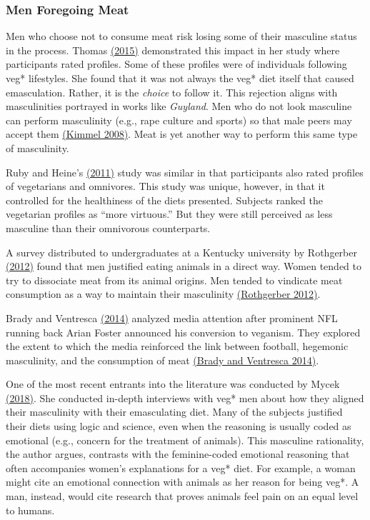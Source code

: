 \documentclass[twoside]{report}
\begin{document}
\begin{multicols}{2}
\subsubsection{Men Foregoing Meat}

Men who choose not to consume meat risk losing some of their masculine
status in the process. Thomas \hyperlink{thomas}{(2015)} demonstrated this impact in her study where participants rated profiles. Some of these profiles were of individuals following veg* lifestyles. She found that it was not always the veg* diet itself that caused emasculation. Rather, it is the
\emph{choice} to follow it. This rejection aligns with masculinities
portrayed in works like \emph{Guyland}. Men who do not look masculine can perform masculinity (e.g., rape culture and sports) so that male peers may accept them \hyperlink{kimmel}{(Kimmel 2008)}. Meat is yet another way
to perform this same type of masculinity.

Ruby and Heine's \hyperlink{ruby}{(2011)} study was similar in that participants also rated profiles of vegetarians and omnivores. This study was unique, however, in that it controlled for the healthiness of the diets
presented. Subjects ranked the vegetarian profiles as ``more virtuous.''
But they were still perceived as less masculine than their omnivorous
counterparts.

A survey distributed to undergraduates at a Kentucky
university by Rothgerber \hyperlink{rothgerber}{(2012)} found that men justified eating animals in a direct way. Women tended to try to dissociate meat from its animal origins. Men tended to vindicate meat consumption as a way to maintain their masculinity \hyperlink{rothgerber}{(Rothgerber 2012)}. 

Brady and Ventresca \hyperlink{brady}{(2014)} analyzed media attention after prominent NFL running back Arian Foster announced his conversion to veganism. They explored the extent to which the media reinforced the link between football, hegemonic masculinity, and the consumption of meat \hyperlink{brady}{(Brady and Ventresca 2014)}.

One of the most recent entrants into the literature was conducted by
Mycek \hyperlink{mycek}{(2018)}. She conducted in-depth interviews with veg* men about how they aligned their masculinity with their emasculating diet. Many of the subjects justified their diets using logic and science, even when the reasoning is usually coded as emotional (e.g., concern for the treatment
of animals). This masculine rationality, the author argues, contrasts
with the feminine-coded emotional reasoning that often accompanies
women's explanations for a veg* diet. For example, a woman might cite an
emotional connection with animals as her reason for being veg*. A man, instead, would cite research that proves animals feel pain on an equal
level to humans.


\end{multicols}
\end{document}
